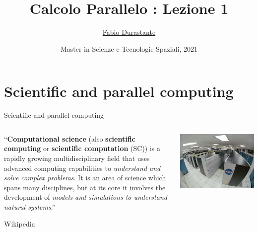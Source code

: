 \documentclass[xcolor={svgnames,usenames}]{beamer}
\title[Calcolo Parallelo]{Calcolo Parallelo : Lezione 1}
\author[F. Durastante]{
    \href{mailto:fabio.durastante@nunipi.it}{Fabio Durastante}
}
\institute{Dipartimento di Matematica, Università di Pisa}
\date[Maggio 2021]{Master in Scienze e Tecnologie Spaziali, 2021}
\begin{document}
\begin{frame}
	\titlepage
\end{frame}

\section[Outline]{}
\frame[allowframebreaks]{\tableofcontents}

\section{Scientific and parallel computing}

\begin{frame}{Scientific and parallel computing}

\begin{columns}
	\begin{column}{0.6\textwidth}
		\begin{center}
		``\textbf{Computational science} (also \textbf{scientific computing} or \textbf{scientific computation} (SC)) is a rapidly growing multidisciplinary field that uses advanced computing capabilities to \emph{understand and solve complex problems}. It is an area of science which spans many disciplines, but at its core it involves the development of \emph{models and simulations to understand natural systems}.''
		\end{center}
		
		\flushright Wikipedia
	\end{column}
	\begin{column}{0.4\textwidth}
		\centering
		\includegraphics[width=\columnwidth]{nasasuperpc.jpg}
		
	\end{column}
\end{columns}

\end{frame}
\end{document}
